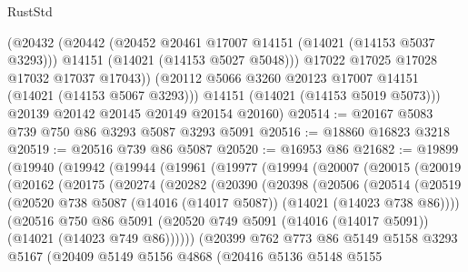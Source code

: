 \begin{lexlean}{RustStd}
\begin{coremodule}
          (@20432
            (@20442
              (@20452 @20461 @17007 @14151 (@14021 (@14153 @5037 @3293)))
              @14151
              (@14021 (@14153 @5027 @5048)))
            @17022
            @17025
            @17028
            @17032
            @17037
            @17043))
        (@20112 @5066 @3260 @20123 @17007 @14151 (@14021 (@14153 @5067 @3293)))
        @14151
        (@14021 (@14153 @5019 @5073)))
      @20139
      @20142
      @20145
      @20149
      @20154
      @20160)
@20514 := @20167 @5083 @739 @750 @86 @3293 @5087 @3293 @5091
@20516 := @18860 @16823 @3218
@20519 := @20516 @739 @86 @5087
@20520 := @16953 @86
@21682 := @19899
    (@19940
      (@19942
        (@19944
          (@19961
            (@19977
              (@19994
                (@20007
                  (@20015
                    (@20019
                      (@20162
                        (@20175
                          (@20274
                            (@20282
                              (@20390
                                (@20398
                                  (@20506
                                    (@20514
                                      (@20519
                                        (@20520
                                          @738
                                          @5087
                                          (@14016 (@14017 @5087))
                                          (@14021 (@14023 @738 @86))))
                                      (@20516
                                        @750
                                        @86
                                        @5091
                                        (@20520
                                          @749
                                          @5091
                                          (@14016 (@14017 @5091))
                                          (@14021 (@14023 @749 @86))))))
                                  (@20399
                                    @762
                                    @773
                                    @86
                                    @5149
                                    @5158
                                    @3293
                                    @5167
                                    (@20409
                                      @5149
                                      @5156
                                      @4868
                                      (@20416
                                        @5136
                                        @5148
                                        @5155

\end{coremodule}
\end{lexlean}
